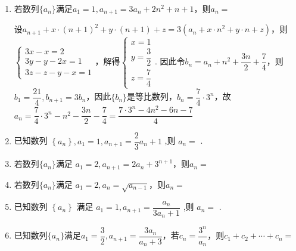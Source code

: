 \begin{enumerate}
    \item 若数列$\{a_n\}$满足$a_1 = 1, a_{n+1} = 3a_n + 2n^2 + n + 1$，则$a_n = $
    \begin{jieda}
        设$a_{n+1} + x \cdot (n+1)^2 + y \cdot (n+1) + z = 3(a_n + x \cdot n^2 + y \cdot n + z)$，则$\left \{ \begin{array}{l}
                3x - x = 2  \\
                3y - y - 2x = 1  \\
                3z - z - y - x = 1
        \end{array} \right.$，解得$\left \{ \begin{array}{l}
                x = 1  \\
                y = \dfrac{3}{2}  \\
                z = \dfrac{7}{4}
        \end{array} \right.$. 因此令$b_n = a_n + n^2 + \dfrac{3n}{2} + \dfrac{7}{4}$，则$b_1 = \dfrac{21}{4}, b_{n+1} = 3b_n$，因此$\{b_n\}$是等比数列，$b_n = \dfrac{7}{4} \cdot 3^n$，故$a_n = \dfrac{7}{4} \cdot 3^n - n^2 - \dfrac{3n}{2} - \dfrac{7}{4} = \dfrac{7 \cdot 3^n - 4n^2 - 6n - 7}{4}$
    \end{jieda}
    \item 已知数列 $\left\{  {a}_{n}\right\}  ,{a}_{1} = 1,{a}_{n + 1} = \dfrac{2}{3}{a}_{n} + 1$ ,则 ${a}_{n} =$ .
    \item 若数列$\{a_n\}$满足 ${a}_{1} = 2,{a}_{n + 1} = 2{a}_{n} + {3}^{n + 1}$，则$a_n = $
    \item 若数列$\{a_n\}$满足 ${a}_{1} = 2,{a}_{n} = \sqrt{{a}_{n - 1}}$，则$a_n = $
    \item 已知数列 $\left\{  {a}_{n}\right\}$ 满足 ${a}_{1} = 1,{a}_{n + 1} = \dfrac{{a}_{n}}{3{a}_{n} + 1}$ ,则 ${a}_{n} =$ .
    \item 已知数列$\{a_n\}$满足$a_1 = \dfrac{3}{2}, a_{n+1} = \dfrac{3a_n}{a_n+3}$，若$c_n = \dfrac{3^n}{a_n}$，则$c_1 + c_2 + \cdots + c_n = $


\end{enumerate}
